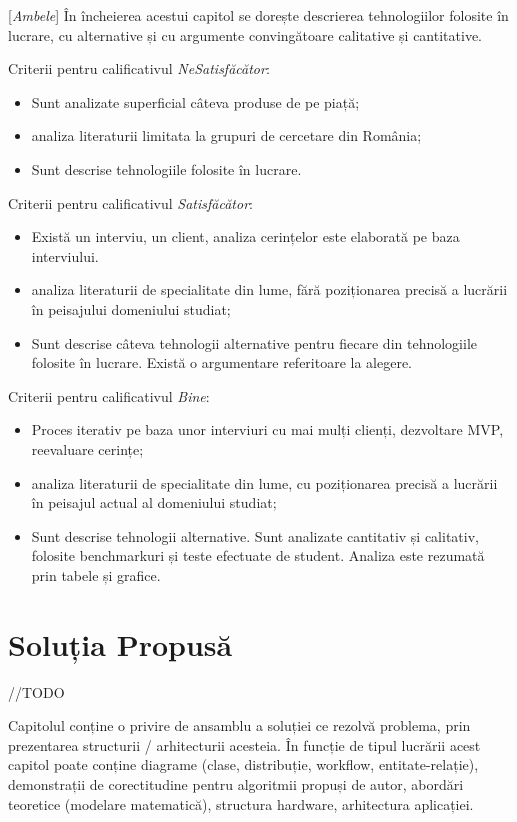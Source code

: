 \documentclass[12pt,a4paper]{report}
\newcommand{\worktype}[1]{[\textit{#1}] }
\newcommand{\dezvoltare}{\worktype{Dezvoltare de produs}}
\newcommand{\cercetare}{\worktype{Cercetare}}
\newcommand{\ambele}{\worktype{Ambele}}
\begin{document}
\ambele În încheierea acestui capitol se dorește descrierea tehnologiilor folosite în lucrare, cu alternative și cu argumente convingătoare calitative și cantitative.

Criterii pentru calificativul \textit{Ne\textit{Satisfăcător}}:
\begin{itemize}
	\item \dezvoltare Sunt analizate superficial câteva produse de pe piață;
	\item \cercetare analiza literaturii limitata la grupuri de cercetare din România;
	\item \ambele Sunt descrise tehnologiile folosite în lucrare.
\end{itemize}

Criterii pentru calificativul \textit{Satisfăcător}:
\begin{itemize}
	\item \dezvoltare Există un interviu, un client, analiza cerințelor este elaborată pe baza interviului.
	\item \cercetare analiza literaturii de specialitate din lume, fără poziționarea precisă a lucrării în peisajului domeniului studiat;
	\item \ambele Sunt descrise câteva tehnologii alternative pentru fiecare din tehnologiile folosite în lucrare. Există o argumentare referitoare la alegere.
\end{itemize}

Criterii pentru calificativul \textit{Bine}:
\begin{itemize}
	\item \dezvoltare Proces iterativ pe baza unor interviuri cu mai mulți clienți, dezvoltare MVP, reevaluare cerințe;
	\item \cercetare analiza literaturii de specialitate din lume, cu poziționarea precisă a lucrării în peisajul actual al domeniului studiat;
	\item \ambele Sunt descrise tehnologii alternative. Sunt analizate cantitativ și calitativ, folosite benchmarkuri și teste efectuate de student. Analiza este rezumată prin tabele și grafice.
\end{itemize}


\chapter{Soluția Propusă}

//TODO

Capitolul conține o privire de ansamblu a soluției ce rezolvă problema, prin prezentarea structurii / arhitecturii acesteia. În funcție de tipul lucrării acest capitol poate conține diagrame (clase, distribuție, workflow, entitate-relație), demonstrații de corectitudine pentru algoritmii propuși de autor, abordări teoretice (modelare matematică), structura hardware, arhitectura aplicației.
\end{document}
